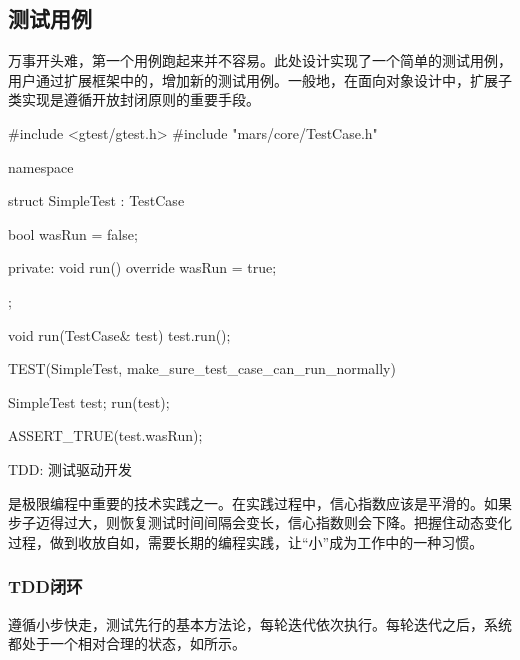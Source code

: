 \begin{content}

\subsection{测试用例}

万事开头难，第一个用例跑起来并不容易。此处设计实现了一个简单的测试用例，用户通过扩展框架中的，增加新的测试用例。一般地，在面向对象设计中，扩展子类实现是遵循开放封闭原则的重要手段。

\begin{leftbar}
 \begin{c++}[caption={\ttfamily{test/mars/core/TestCaseSpec.cc}}]
#include <gtest/gtest.h>
#include "mars/core/TestCase.h"

namespace {
  struct SimpleTest : TestCase {
    bool wasRun = false;

  private:
    void run() override {
      wasRun = true;
    }
  };

  void run(TestCase& test) {
    test.run();
  }
}

TEST(SimpleTest, make_sure_test_case_can_run_normally) {
  SimpleTest test;
  run(test);

  ASSERT_TRUE(test.wasRun);
}
 \end{c++}
\end{leftbar}

\begin{episode}{TDD: 测试驱动开发}

\begin{content}

是极限编程中重要的技术实践之一。在实践过程中，信心指数应该是平滑的。如果步子迈得过大，则恢复测试时间间隔会变长，信心指数则会下降。把握住动态变化过程，做到收放自如，需要长期的编程实践，让“小”成为工作中的一种习惯。

\subsubsection{TDD闭环}

遵循小步快走，测试先行的基本方法论，每轮迭代依次执行。每轮迭代之后，系统都处于一个相对合理的状态，如所示。


\end{content}
\end{episode}
\end{content}
